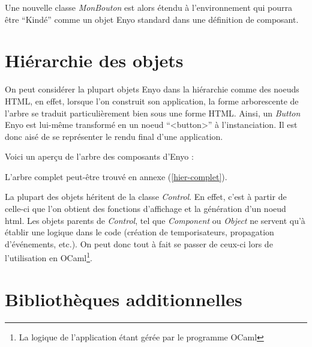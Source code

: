 \documentclass[11pt,a4paper]{report}
\begin{document}
Une nouvelle classe \emph{MonBouton} est alors étendu à l'environnement qui pourra être
``Kindé'' comme un objet Enyo standard dans une définition de composant.

\section{Hiérarchie des objets}

On peut considérer la plupart objets Enyo dans la hiérarchie comme des noeuds HTML,
en effet, lorsque l'on construit son application, la forme arborescente de l'arbre se traduit
particulièrement bien sous une forme HTML. Ainsi, un \emph{Button} Enyo est lui-même transformé
en un noeud ``<button>'' à l'instanciation. Il est donc aisé de se représenter le rendu final 
d'une application.

Voici un aperçu de l'arbre des composants d'Enyo :\medskip


L'arbre complet peut-être trouvé en annexe (\ref{hier-complet}).

La plupart des objets héritent de la classe \emph{Control}. En effet, c'est à partir de celle-ci
que l'on obtient des fonctions d'affichage et la génération d'un noeud html.
Les objets parents de \emph{Control}, tel que \emph{Component} ou \emph{Object} ne servent
qu'à établir une logique dans le code (création de temporisateurs, propagation d'événements, etc.).
On peut donc tout à fait se passer de ceux-ci lors de l'utilisation en OCaml\footnote{La logique de
l'application étant gérée par le programme OCaml}.

\section{Bibliothèques additionnelles}
\end{document}
